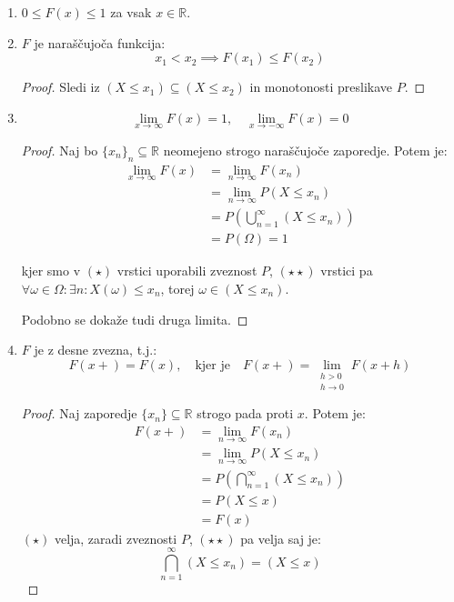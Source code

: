 \documentclass[12pt]{book}
\theoremstyle{definition}
\theoremstyle{plain}
\theoremstyle{plain}
\theoremstyle{plain}
\theoremstyle{remark}
\begin{document}
\begin{enumerate}
    \item $0 \leq F(x) \leq 1$ za vsak $x\in \mathbb{R}.$
    \item $F$ je naraščujoča funkcija: 
    $$
    x_1 < x_2 \implies F(x_1) \leq F(x_2)
    $$
    \begin{proof}
        Sledi iz $\left(X \leq x_1\right) \subseteq\left(X \leq x_2\right)$ in monotonosti preslikave $P$.
    \end{proof}
    \item 
    $$
    \lim _{x \to \infty} F(x)=1, \quad \lim _{x \to -\infty} F(x)=0
    $$
    \begin{proof}
        Naj bo $\{x_n\}_n \subseteq \mathbb{R}$ neomejeno strogo naraščujoče zaporedje. Potem je: 
        \begin{align*}
            \lim _{x \to \infty} F(x) &= \lim _{n \to \infty} F\left(x_n\right) \\
            &=\lim _{n \to \infty} P\left(X \leq x_n\right) \\
            &=P\left(\bigcup_{n=1}^{\infty}\left(X \leq x_n\right)\right) \tag{$\star$} \\
            &=P(\Omega)=1 \tag{$\star \star$}
        \end{align*}
        
        \quad kjer smo v $(\star)$ vrstici uporabili zveznost $P$, $(\star \star)$ vrstici pa $\forall \omega \in \Omega: \exists n: X(\omega) \leq x_n$, torej $\omega \in\left(X \leq x_n\right)$. 

        Podobno se dokaže tudi druga limita.
    \end{proof}
    \item $F$ je z desne zvezna, t.j.:
    $$
    F(x+)=F(x), \quad \text{kjer je} \quad F(x+)=\lim _{\substack{h > 0 \\ h \to 0}} F(x+h)
    $$
    \begin{proof}
        Naj zaporedje $\{x_n\} \subseteq \mathbb{R}$ strogo pada proti $x$. Potem je:
        \begin{align*}
            F(x+)&=\lim _{n \to \infty} F\left(x_n\right) \\
            &=\lim _{n \rightarrow \infty} P\left(X \leq x_n\right) \\
            &=P\left(\bigcap_{n=1}^{\infty}\left(X \leq x_n\right)\right) \tag{$\star$} \\
            &=P(X \leq x) \tag{$\star \star$} \\
            &=F(x)
        \end{align*}
        $(\star)$ velja, zaradi zveznosti $P$, $(\star \star)$ pa velja saj je: $$\bigcap_{n=1}^{\infty}\left(X \leq x_n\right)=(X \leq x)$$


\end{proof}
\end{enumerate}
\end{document}
